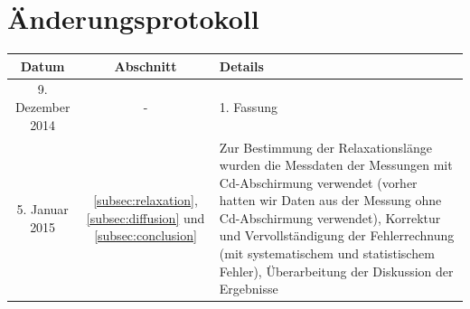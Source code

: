 \documentclass[a4paper,titlepage]{scrartcl}
\numberwithin{equation}{section}
\begin{document}
\section{Änderungsprotokoll}
\begin{table}[H]
\centering
\begin{tabularx}{\textwidth}{| c | c | X |}
\hline
\textbf{Datum} & \textbf{Abschnitt} & \textbf{Details}\\
\hline
9. Dezember 2014 & - & 1. Fassung\\
\hline
5. Januar 2015 & \ref{subsec:relaxation}, \ref{subsec:diffusion} und \ref{subsec:conclusion} & Zur Bestimmung der Relaxationslänge wurden die Messdaten der Messungen mit Cd-Abschirmung verwendet (vorher hatten wir Daten aus der Messung ohne Cd-Abschirmung verwendet), Korrektur und Vervollständigung der Fehlerrechnung (mit systematischem und statistischem Fehler), Überarbeitung der Diskussion der Ergebnisse\\
\hline
\end{tabularx}
\end{table}


\end{document}
